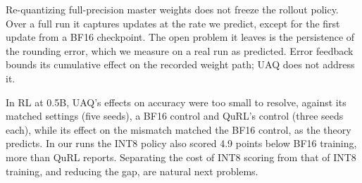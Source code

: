 Re-quantizing full-precision master weights does not freeze the rollout policy. Over a full run it captures updates at the rate we predict, except for the first update from a BF16 checkpoint. The open problem it leaves is the persistence of the rounding error, which we measure on a real run as predicted. Error feedback bounds its cumulative effect on the recorded weight path; UAQ does not address it.

In RL at 0.5B, UAQ's effects on accuracy were too small to resolve, against its matched settings (five seeds), a BF16 control and QuRL's control (three seeds each), while its effect on the mismatch matched the BF16 control, as the theory predicts. In our runs the INT8 policy also scored 4.9 points below BF16 training, more than QuRL reports. Separating the cost of INT8 scoring from that of INT8 training, and reducing the gap, are natural next problems.
